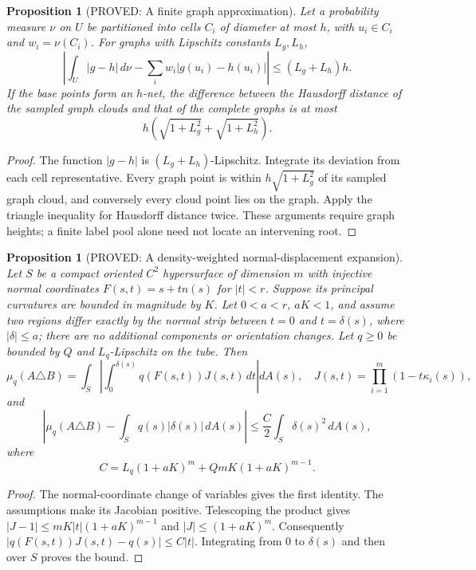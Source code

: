\documentclass[11pt]{article}
\newtheorem{proposition}[theorem]{Proposition}
\theoremstyle{definition}
\theoremstyle{remark}
\begin{document}
\begin{proposition}[PROVED: A finite graph approximation]
\label{rthreegeo:quadrature}
Let a probability measure $\nu$ on $U$ be partitioned into cells $C_i$
of diameter at most $h$, with $u_i\in C_i$ and $w_i=\nu(C_i)$.
For graphs with Lipschitz constants $L_g,L_h$,
\[
 \left|\int_U|g-h|\,d\nu-
 \sum_iw_i|g(u_i)-h(u_i)|\right|\le(L_g+L_h)h.
\]
If the base points form an $h$-net, the difference between the Hausdorff
distance of the sampled graph clouds and that of the complete graphs
is at most
\[
 h\left(\sqrt{1+L_g^2}+\sqrt{1+L_h^2}\right).
\]
\end{proposition}
\begin{proof}
The function $|g-h|$ is $(L_g+L_h)$-Lipschitz. Integrate its deviation
from each cell representative. Every graph point is within
$h\sqrt{1+L_g^2}$ of its sampled graph cloud, and conversely every cloud
point lies on the graph. Apply the triangle inequality for Hausdorff
distance twice. These arguments require graph heights; a finite label
pool alone need not locate an intervening root.
\end{proof}

\begin{proposition}[PROVED: A density-weighted normal-displacement expansion]
\label{rthreegeo:tube}
Let $S$ be a compact oriented $C^2$ hypersurface of dimension $m$ with
injective normal coordinates $F(s,t)=s+tn(s)$ for $|t|<r$.
Suppose its principal curvatures are bounded in magnitude by $K$.
Let $0<a<r$, $aK<1$, and assume two regions differ exactly by the
normal strip between $t=0$ and $t=\delta(s)$, where $|\delta|\le a$;
there are no additional components or orientation changes.
Let $q\ge0$ be bounded by $Q$ and $L_q$-Lipschitz on the tube. Then
\[
 \mu_q(A\triangle B)=
 \int_S\left|\int_0^{\delta(s)}q(F(s,t))J(s,t)\,dt\right|dA(s),
 \quad J(s,t)=\prod_{i=1}^m(1-t\kappa_i(s)),
\]
and
\[
 \left|\mu_q(A\triangle B)-\int_Sq(s)|\delta(s)|\,dA(s)\right|
 \le\frac C2\int_S\delta(s)^2\,dA(s),
\]
where
\[
 C=L_q(1+aK)^m+QmK(1+aK)^{m-1}.
\]
\end{proposition}
\begin{proof}
The normal-coordinate change of variables gives the first identity.
The assumptions make its Jacobian positive. Telescoping the product
gives
$|J-1|\le mK|t|(1+aK)^{m-1}$ and $|J|\le(1+aK)^m$.
Consequently
$|q(F(s,t))J(s,t)-q(s)|\le C|t|$.
Integrating from $0$ to $\delta(s)$ and then over $S$ proves the bound.
\end{proof}
\end{document}
